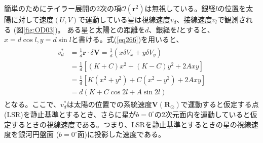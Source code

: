 簡単のためにテイラー展開の2次の項$\mathcal{O}(\pmb{r}^2)$は無視している。銀経$l$の位置を太陽に対して速度$(U,V)$で運動している星は視線速度$v_d$、接線速度$v_l$で観測される (図\ref{fig:OD03})。
ある星と太陽との距離を$d$、銀経を$l$とすると、$x = d\cos l,y = d \sin l$と書ける。式(\ref{eq266})を用いると、
\begin{align}
\begin{aligned}
	v^*_d &= \frac{1}{d} \pmb{r} \cdot \delta\pmb{V}
	= \frac{1}{d}(x\delta V_x + y\delta V_y) \\
	&= \frac{1}{d} [(K+C)x^2 + (K-C)y^2 + 2Axy] \\
	&= \frac{1}{d} [K(x^2 + y^2) + C(x^2 - y^2) + 2Axy] \\
	&= d(K + C\cos2l + A\sin2l)
\end{aligned} \label{vd}
\end{align}
となる。ここで、$v^*_d$は太陽の位置での系統速度$\pmb{V}(\pmb{R}_{\odot})$で運動すると仮定する点 (LSR)を静止基準とするとき、さらに星が$b=0^{\circ}$の2次元面内を運動していると仮定するときの視線速度である。つまり、LSRを静止基準とするときの星の視線速度を銀河円盤面 ($b=0^{\circ}$面)に投影した速度である。

